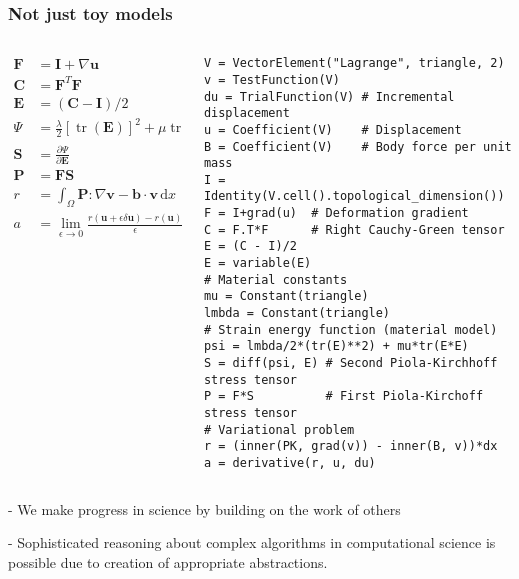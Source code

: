 \documentclass[presentation]{beamer}
\DeclareMathOperator{\tr}{tr}
\begin{document}
\begin{frame}[fragile]
  \frametitle{Not just toy models}
  \begin{columns}
    \begin{column}{0.4\textwidth}
      \begin{align*}
        \mathbf{F} &= \mathbf{I} + \nabla \mathbf{u}\\
        \mathbf{C} &= \mathbf{F}^T \mathbf{F}\\
        \mathbf{E} &= (\mathbf{C} - \mathbf{I}) / 2\\
        \Psi &= \frac{\lambda}{2}[\tr(\mathbf{E})]^2 + \mu \tr(\mathbf{E}^2)\\
        \mathbf{S} &= \frac{\partial \Psi}{\partial \mathbf{E}}\\
        \mathbf{P} &= \mathbf{F} \mathbf{S}\\
        r &= \int_\Omega \mathbf{P} : \nabla \mathbf{v} - \mathbf{b} \cdot \mathbf{v}\,\text{d}x\\
        a &= \lim_{\epsilon \to 0} \frac{r(\mathbf{u} + \epsilon \delta \mathbf{u}) - r(\mathbf{u})}{\epsilon}
      \end{align*}
    \end{column}
    \begin{column}{0.6\textwidth}
\begin{verbatim}
V = VectorElement("Lagrange", triangle, 2)
v = TestFunction(V)
du = TrialFunction(V) # Incremental displacement
u = Coefficient(V)    # Displacement
B = Coefficient(V)    # Body force per unit mass
I = Identity(V.cell().topological_dimension())
F = I+grad(u)  # Deformation gradient
C = F.T*F      # Right Cauchy-Green tensor
E = (C - I)/2
E = variable(E)
# Material constants
mu = Constant(triangle)
lmbda = Constant(triangle)
# Strain energy function (material model)
psi = lmbda/2*(tr(E)**2) + mu*tr(E*E)
S = diff(psi, E) # Second Piola-Kirchhoff stress tensor
P = F*S          # First Piola-Kirchoff stress tensor
# Variational problem
r = (inner(PK, grad(v)) - inner(B, v))*dx
a = derivative(r, u, du)
\end{verbatim}
    \end{column}
  \end{columns}  
\end{frame}

- We make progress in science by building on the work of others

- Sophisticated reasoning about complex algorithms in computational
science is possible due to creation of appropriate abstractions.
\end{document}
